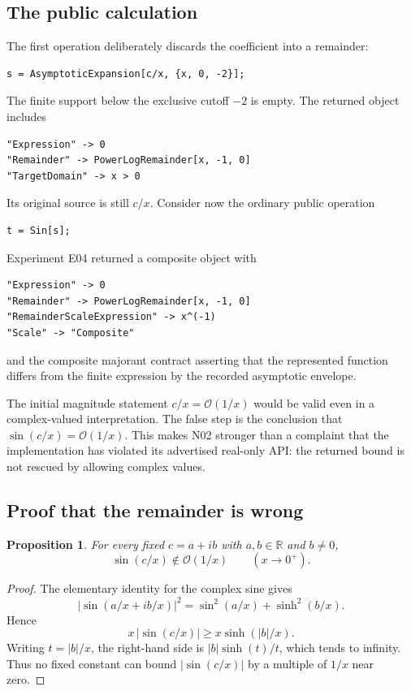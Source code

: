 \documentclass[11pt,a4paper]{article}
\newcommand{\OO}{\mathcal O}
\newcommand{\RR}{\mathbb R}
\newtheorem{proposition}{Proposition}[section]
\begin{document}
\subsection{The public calculation}
The first operation deliberately discards the coefficient into a remainder:
\begin{lstlisting}
s = AsymptoticExpansion[c/x, {x, 0, -2}];
\end{lstlisting}
The finite support below the exclusive cutoff \(-2\) is empty. The returned object includes
\begin{lstlisting}
"Expression" -> 0
"Remainder" -> PowerLogRemainder[x, -1, 0]
"TargetDomain" -> x > 0
\end{lstlisting}
Its original source is still \(c/x\). Consider now the ordinary public operation
\begin{lstlisting}
t = Sin[s];
\end{lstlisting}
Experiment E04 returned a composite object with
\begin{lstlisting}
"Expression" -> 0
"Remainder" -> PowerLogRemainder[x, -1, 0]
"RemainderScaleExpression" -> x^(-1)
"Scale" -> "Composite"
\end{lstlisting}
and the composite majorant contract asserting that the represented function differs from the finite expression by the recorded asymptotic envelope.

The initial magnitude statement \(c/x=\OO(1/x)\) would be valid even in a complex-valued interpretation. The false step is the conclusion that \(\sin(c/x)=\OO(1/x)\). This makes N02 stronger than a complaint that the implementation has violated its advertised real-only API: the returned bound is not rescued by allowing complex values.

\subsection{Proof that the remainder is wrong}
\begin{proposition}\label{prop:sin}
For every fixed \(c=a+ib\) with \(a,b\in\RR\) and \(b\ne0\),
\[
 \sin(c/x)\notin\OO(1/x)\qquad(x\to0^+).
\]
\end{proposition}
\begin{proof}
The elementary identity for the complex sine gives
\[
 |\sin(a/x+ib/x)|^2
 =\sin^2(a/x)+\sinh^2(b/x).
\]
Hence
\[
 x\,|\sin(c/x)|\ge x\sinh(|b|/x).
\]
Writing \(t=|b|/x\), the right-hand side is \(|b|\sinh(t)/t\), which tends to infinity. Thus no fixed constant can bound \(|\sin(c/x)|\) by a multiple of \(1/x\) near zero.
\end{proof}
\end{document}

